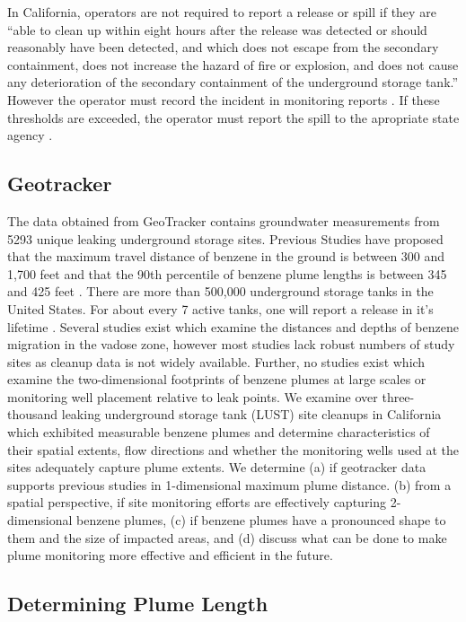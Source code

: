 \documentclass[draft,linenumbers]{agujournal2018}
\begin{document}
In California, operators are not required to report a release or spill
if they are ``able to clean up within eight hours after the release was
detected or should reasonably have been detected, and which does not
escape from the secondary containment, does not increase the hazard of
fire or explosion, and does not cause any deterioration of the secondary
containment of the underground storage tank.'' However the operator must
record the incident in monitoring reports \citep{careport25294}. If
these thresholds are exceeded, the operator must report the spill to the
apropriate state agency \citep{careport25295}.

\subsection{Geotracker}

The data obtained from GeoTracker contains groundwater measurements from
5293 unique leaking underground storage sites. Previous Studies have
proposed that the maximum travel distance of benzene in the ground is
between 300 and 1,700 feet and that the 90th percentile of benzene plume
lengths is between 345 and 425 feet \citep{connor2015}. There are more
than 500,000 underground storage tanks in the United States. For about
every 7 active tanks, one will report a release in it's lifetime
\citep{ustperformance}. Several studies exist which examine the
distances and depths of benzene migration in the vadose zone, however
most studies lack robust numbers of study sites as cleanup data is not
widely available. Further, no studies exist which examine the
two-dimensional footprints of benzene plumes at large scales or
monitoring well placement relative to leak points. We examine over
three-thousand leaking underground storage tank (LUST) site cleanups in
California which exhibited measurable benzene plumes and determine
characteristics of their spatial extents, flow directions and whether
the monitoring wells used at the sites adequately capture plume extents.
We determine (a) if geotracker data supports previous studies in
1-dimensional maximum plume distance. (b) from a spatial perspective, if
site monitoring efforts are effectively capturing 2-dimensional benzene
plumes, (c) if benzene plumes have a pronounced shape to them and the
size of impacted areas, and (d) discuss what can be done to make plume
monitoring more effective and efficient in the future.

\subsection{Determining Plume Length}
\end{document}
